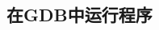 \documentclass[class=book, crop=false]{standalone}
\begin{document}
\begin{CJK}{UTF8}{gbsn}

\chapter{在GDB中运行程序}



























\cleardoublepage

\end{CJK}
\end{document}
